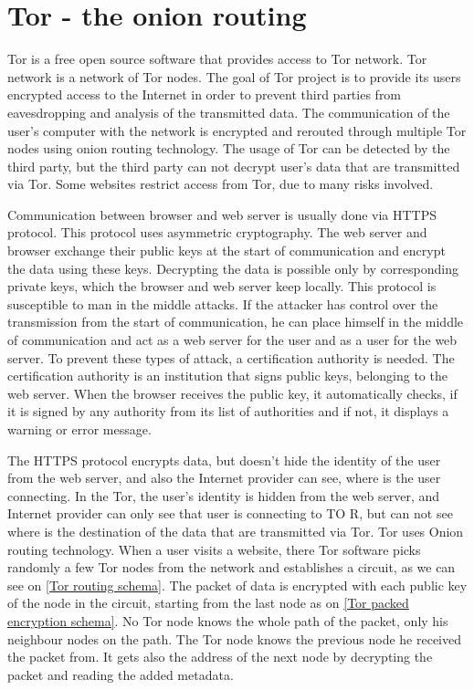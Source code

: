 \documentclass[
  digital, %
  table,   %
  lof,     %
  lot,     %
  oneside
]{fithesis3}
\begin{document}
\section{Tor - the onion routing}

Tor \parencite{dingledine2004tor} is a free open source software that provides access to Tor network. Tor network is a network of Tor nodes.
The goal of Tor project is to provide its users encrypted access to the Internet in order to prevent third parties
from eavesdropping and analysis of the transmitted data.
The communication of the user's computer with the network is encrypted and rerouted through multiple Tor nodes using onion routing technology.
The usage of Tor can be detected by the third party, but the third party can not decrypt user's data that are transmitted
 via Tor.
Some websites restrict access from Tor, due to many risks involved.

Communication between browser and web server is usually done via HTTPS protocol.
This protocol uses asymmetric cryptography. The web server and browser exchange their public keys at the start of communication
and encrypt the data using these keys. Decrypting the data is possible only by corresponding private keys,
which the browser and web server keep locally. This protocol is susceptible to man in the middle attacks.
If the attacker has control over the transmission from the start of communication, he can place himself in the middle of communication and act as a web server for the user and as a user for the web server. To prevent these types of attack,
 a certification authority is needed. The certification authority is an institution that signs public keys, belonging to the web server.
 When the browser receives the public key, it automatically checks, if it is signed by any authority from its list of authorities and if not,
 it displays a warning or error message.
 
The HTTPS protocol encrypts data, but doesn't hide the identity of the user from the web server,
 and also the Internet provider can see, where is the user connecting.
 In the Tor, the user's identity is hidden from the web server, and Internet provider can only see that user is connecting to TO
R, but can not see where is the destination of the data that are transmitted via Tor.
 Tor uses Onion routing technology. When a user visits a website, there Tor software picks randomly a few Tor nodes from the network and establishes a circuit, as we can see on \ref{Tor routing schema}. 
 The packet of data is encrypted with each public key of the node in the circuit, starting from the last node as on \ref{Tor
 packed encryption schema}.
 No Tor node knows the whole path of the packet, only his neighbour nodes on the path.
 The Tor node knows the previous node he received the packet from. It gets also the address 
 of the next node by decrypting the packet and reading the added metadata.
 
\end{document}
